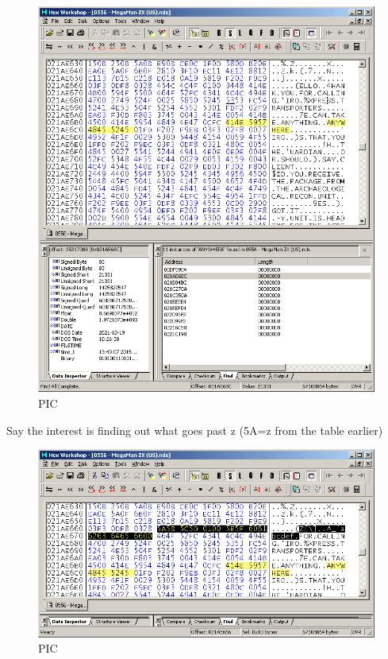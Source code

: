 \documentclass[
]{book}
\begin{document}
\begin{figure}
\centering
\includegraphics{images/89_home_fast6191_romhackingguide_unrenamed_file___nal_borders_romhackingguidertextalteration2.png}
\caption{PIC}
\end{figure}

Say the interest is finding out what goes past z (5A=z from the table earlier)

\begin{figure}
\centering
\includegraphics{images/90_home_fast6191_romhackingguide_unrenamed_file___nal_borders_romhackingguidertextalteration3.png}
\caption{PIC}
\end{figure}
\end{document}
